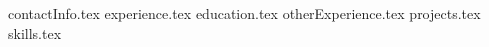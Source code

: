 \documentclass{style}
\begin{document}
    {contactInfo.tex}
    {experience.tex}
    {education.tex}
    {otherExperience.tex}
    {projects.tex}
    {skills.tex}
\end{document}
